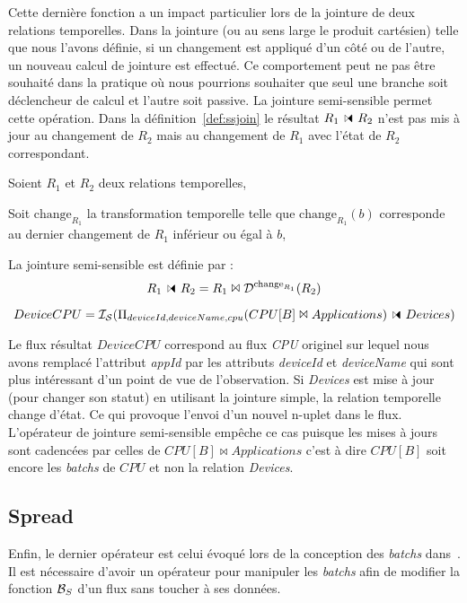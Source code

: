 Cette dernière fonction a un impact particulier lors de la jointure de deux relations temporelles. Dans la jointure (ou au sens large le produit cartésien) telle que nous l'avons définie, si un changement est appliqué d'un côté ou de l'autre, un nouveau calcul de jointure est effectué. Ce comportement peut ne pas être souhaité dans la pratique où nous pourrions souhaiter que seul une branche soit déclencheur de calcul et l'autre soit passive. La jointure semi-sensible permet cette opération. Dans la définition~\ref{def:ssjoin} le résultat $R_1 \ssjoin R_2$ n'est pas mis à jour au changement de $R_2$ mais au changement de $R_1$ avec l'état de $R_2$ correspondant.

\begin{defi}\label{def:ssjoin}
    Soient $R_1$ et $R_2$ deux relations temporelles,

    Soit $\mathrm{change}_{R_1}$ la transformation temporelle telle que $\mathrm{change}_{R_1}(b)$ corresponde au dernier changement de $R_1$ inférieur ou égal à $b$,

    La jointure semi-sensible est définie par :
        $$R_1\ssjoin R_2 = R_1 \Join \D^{\mathrm{change}_{R_1}}(R_2)$$
\end{defi}
\begin{example}
    $$DeviceCPU=\IS(\Pi_{deviceId,deviceName,cpu}(CPU[B]\Join Applications)\ssjoin Devices)$$

Le flux résultat $DeviceCPU$ correspond au flux \textit{CPU} originel sur lequel nous avons remplacé l'attribut \textit{appId} par les attributs \textit{deviceId} et \textit{deviceName} qui sont plus intéressant d'un point de vue de l'observation. Si \textit{Devices} est mise à jour (pour changer son statut) en utilisant la jointure simple, la relation temporelle change d'état. Ce qui provoque l'envoi d'un nouvel n-uplet dans le flux. L'opérateur de jointure semi-sensible empêche ce cas puisque les mises à jours sont cadencées par celles de $CPU[B]\Join Applications$ c'est à dire $CPU[B]$ soit encore les \textit{batchs} de $CPU$ et non la relation \textit{Devices}.
\end{example}

\subsection{Spread}
Enfin, le dernier opérateur est celui évoqué lors de la conception des \textit{batchs} dans~\cite{Jain:spread}. Il est nécessaire d'avoir un opérateur pour manipuler les \textit{batchs} afin de modifier la fonction $\mathcal{B}_S$ d'un flux sans toucher à ses données.

